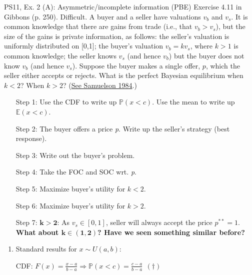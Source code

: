 \begin{frame}{PS11, Ex. 2 (A): Asymmetric/incomplete information (PBE)}
    Exercise 4.11 in Gibbons (p. 250). Difficult. A buyer and a seller have valuations $v_b$ and $v_s$. It is common knowledge that there are gains from trade (i.e., that $v_b > v_s$), but the size of the gains is private information, as follows: the seller’s valuation is uniformly distributed on [0,1]; the buyer’s valuation $v_b = kv_s$, where $k > 1$ is common knowledge; the seller knows $v_s$ (and hence $v_b$) but the buyer does not know $v_b$ (and hence $v_s$). Suppose the buyer makes a single offer, $p$, which the seller either accepts or rejects. What is the perfect Bayesian equilibrium when $k < 2$? When $k > 2$? (\href{https://www.jstor.org/stable/1911195}{See Samuelson 1984}.) \vspace{-8pt}
    \begin{multicols}{2}
      \begin{itemize}
        \item[Step 1:] Use the CDF to write up $\mathbb{P}(x<c)$. Use the mean to write up $\mathbb{E}(x<c)$.
        \item[Step 2:] \vspace{-2pt} The buyer offers a price \textit{p}. Write up the seller's strategy (best response).
        \item[Step 3:] \vspace{-2pt} Write out the buyer's problem.
        \item[Step 4:] \vspace{-2pt} Take the FOC and SOC wrt. \textit{p}.
        \item[Step 5:] \vspace{-2pt} Maximize buyer's utility for $k<2$.
        \item[Step 6:] \vspace{-2pt} Maximize buyer's utility for $k>2$.
        \item[Step 7:] \vspace{-2pt} $\bm{k>2}$: As $v_s\in[0,1]$, seller will always accept the price $p^{**}=1$.\\
        \textbf{What about $\bm{k\in(1,2)}$? Have we seen something similar before?}
      \end{itemize}
      \vfill\null\columnbreak
      \begin{enumerate}
        \item \vspace{-2pt} Standard results for $x\sim U(a, b):$
        \item[CDF:] \vspace{-2pt} $F(x)=\frac{x-a}{b-a}\Rightarrow\mathbb{P}(x<c)=\frac{c-a}{b-a}\ \ (\dagger)$

\end{enumerate}
\end{multicols}
\end{frame}
